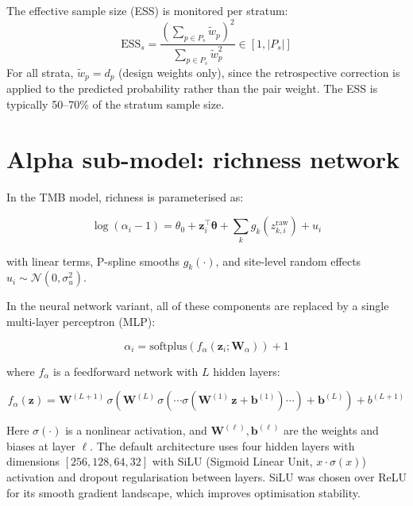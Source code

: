 \documentclass{article}
\begin{document}
The effective sample size (ESS) is monitored per stratum:
\begin{equation}
    \text{ESS}_s = \frac{\left(\sum_{p \in P_s} \tilde{w}_p\right)^2}{\sum_{p \in P_s} \tilde{w}_p^2} \in [1, |P_s|]
\end{equation}
For all strata, $\tilde{w}_p = d_p$ (design weights only), since the retrospective correction is applied to the predicted probability rather than the pair weight. The ESS is typically 50--70\% of the stratum sample size.

\section{Alpha sub-model: richness network}

In the TMB model, richness is parameterised as:

\begin{equation*}
    \log(\alpha_i - 1) = \theta_0 + \mathbf{z}_i^\top\bm{\theta} + \sum_k g_k(z_{k,i}^{\text{raw}}) + u_i
\end{equation*}

with linear terms, P-spline smooths $g_k(\cdot)$, and site-level random effects $u_i \sim \mathcal{N}(0, \sigma_u^2)$.

In the neural network variant, all of these components are replaced by a single multi-layer perceptron (MLP):

\begin{equation}
    \alpha_i = \text{softplus}\!\left(f_\alpha(\mathbf{z}_i; \bm{W}_\alpha)\right) + 1
\end{equation}

where $f_\alpha$ is a feedforward network with $L$ hidden layers:

\begin{equation}
    f_\alpha(\mathbf{z}) = \mathbf{W}^{(L+1)}\,\sigma\!\left(\mathbf{W}^{(L)}\,\sigma\!\left(\cdots\sigma\!\left(\mathbf{W}^{(1)}\,\mathbf{z} + \mathbf{b}^{(1)}\right)\cdots\right) + \mathbf{b}^{(L)}\right) + b^{(L+1)}
\end{equation}

Here $\sigma(\cdot)$ is a nonlinear activation, and $\mathbf{W}^{(\ell)}, \mathbf{b}^{(\ell)}$ are the weights and biases at layer $\ell$. The default architecture uses four hidden layers with dimensions $[256, 128, 64, 32]$ with SiLU (Sigmoid Linear Unit, $x\cdot\sigma(x)$) activation and dropout regularisation between layers. SiLU was chosen over ReLU for its smooth gradient landscape, which improves optimisation stability.
\end{document}
